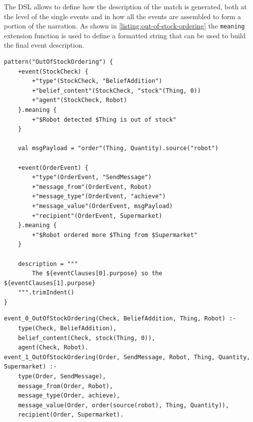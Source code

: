 \documentclass{scrartcl}
\begin{document}
The DSL allows to define how the description of the match is generated, both at the level of the single events and in how all the events are assembled to form a portion of the narration.
%
As shown in \ref{listing:out-of-stock-ordering} the \verb|meaning| extension function is used to define a formatted string that can be used to build the final event description.

\begin{listing}[!ht]
\begin{verbatim}
pattern("OutOfStockOrdering") {
    +event(StockCheck) {
        +"type"(StockCheck, "BeliefAddition")
        +"belief_content"(StockCheck, "stock"(Thing, 0))
        +"agent"(StockCheck, Robot)
    }.meaning {
        +"$Robot detected $Thing is out of stock"
    }

    val msgPayload = "order"(Thing, Quantity).source("robot")

    +event(OrderEvent) {
        +"type"(OrderEvent, "SendMessage")
        +"message_from"(OrderEvent, Robot)
        +"message_type"(OrderEvent, "achieve")
        +"message_value"(OrderEvent, msgPayload)
        +"recipient"(OrderEvent, Supermarket)
    }.meaning {
        +"$Robot ordered more $Thing from $Supermarket"
    }

    description = """
        The ${eventClauses[0].purpose} so the ${eventClauses[1].purpose}
    """.trimIndent()
}
\end{verbatim}
\caption{Example sifting pattern for checking that when out of stock the robot orders new beer from the supermarket.}
\label{listing:out-of-stock-ordering}
\end{listing}

\begin{listing}
\begin{verbatim}
event_0_OutOfStockOrdering(Check, BeliefAddition, Thing, Robot) :-
    type(Check, BeliefAddition), 
    belief_content(Check, stock(Thing, 0)), 
    agent(Check, Robot).
event_1_OutOfStockOrdering(Order, SendMessage, Robot, Thing, Quantity, Supermarket) :-
    type(Order, SendMessage), 
    message_from(Order, Robot), 
    message_type(Order, achieve), 
    message_value(Order, order(source(robot), Thing, Quantity)), 
    recipient(Order, Supermarket).
\end{verbatim}
\caption{The prolog rules that are generated by the OutOfStockOrdering pattern.}
\label{listing:out-of-stock-ordering-prolog-rules}
\end{listing}
\end{document}
